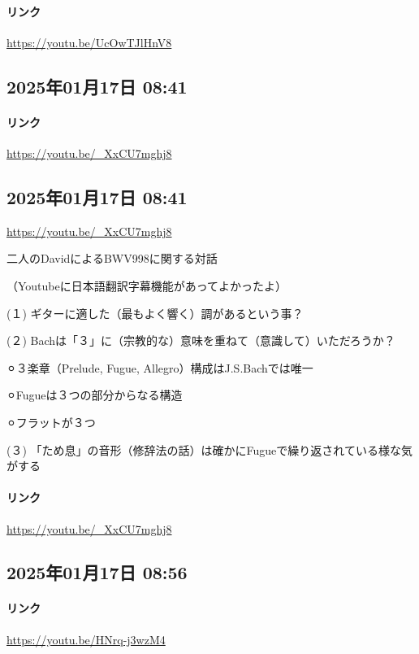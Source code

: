 \paragraph{リンク}
\url{https://youtu.be/UcOwTJlHnV8}

\subsection*{2025年01月17日 08:41}

\paragraph{リンク}
\url{https://youtu.be/_XxCU7mghj8}

\subsection*{2025年01月17日 08:41}

\url{https://youtu.be/_XxCU7mghj8}

二人のDavidによるBWV998に関する対話

（Youtubeに日本語翻訳字幕機能があってよかったよ）

(１) ギターに適した（最もよく響く）調があるという事？

(２) Bachは「３」に（宗教的な）意味を重ねて（意識して）いただろうか？

⚪︎３楽章（Prelude, Fugue, Allegro）構成はJ.S.Bachでは唯一

⚪︎Fugueは３つの部分からなる構造

⚪︎フラットが３つ

(３) 「ため息」の音形（修辞法の話）は確かにFugueで繰り返されている様な気がする

\paragraph{リンク}
\url{https://youtu.be/_XxCU7mghj8}

\subsection*{2025年01月17日 08:56}

\paragraph{リンク}
\url{https://youtu.be/HNrq-j3wzM4}

